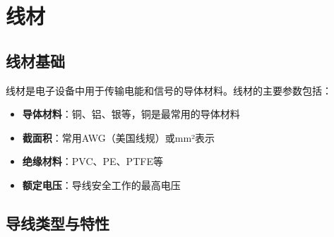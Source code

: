 
\chapter{线材}
\label{chap:wiring_materials}

\section{线材基础}
\label{sec:wiring_fundamentals}

线材是电子设备中用于传输电能和信号的导体材料。线材的主要参数包括：

\begin{itemize}
    \item \textbf{导体材料}：铜、铝、银等，铜是最常用的导体材料
    \item \textbf{截面积}：常用AWG（美国线规）或mm²表示
    \item \textbf{绝缘材料}：PVC、PE、PTFE等
    \item \textbf{额定电压}：导线安全工作的最高电压
\end{itemize}

\section{导线类型与特性}
\label{sec:wire_types}

